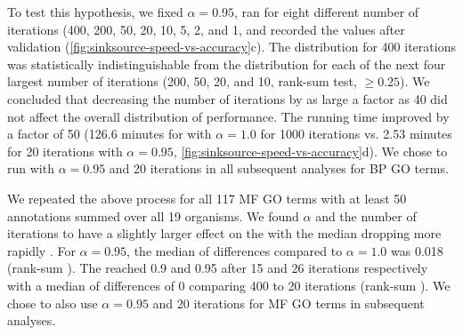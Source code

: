 To test this hypothesis, we fixed $\alpha = 0.95$, ran \sinksource for eight different number of iterations (400, 200, 50, 20, 10, 5, 2, and 1, and recorded the
\fmax values after \loso validation (\cref{fig:sinksource-speed-vs-accuracy}c). The \fmax distribution for 400 iterations was statistically indistinguishable from the distribution for each of the next four largest number of iterations (200, 50, 20, and 10, rank-sum test, \pval $\geq 0.25$).
We concluded that decreasing the number of iterations by as large a factor as 40 did not affect the overall distribution of \loso performance. 
The running time improved by a factor of 50 (126.6 minutes for \sinksource with $\alpha = 1.0$ for 1000 iterations vs. 2.53 minutes for 20 iterations with $\alpha = 0.95$, \cref{fig:sinksource-speed-vs-accuracy}d). 
We chose to run \sinksource with $\alpha = 0.95$ and 20 iterations in all subsequent analyses for BP GO terms. 

We repeated the above process for all 117 MF GO terms with at least 50 annotations summed over all 19 organisms. We found $\alpha$ and the number of iterations to have a slightly larger effect on the \fmax with the median dropping more rapidly . 
For $\alpha = 0.95$, the median of \fmax differences compared to $\alpha = 1.0$ was 0.018 (rank-sum ). 
The \ktau reached 0.9 and 0.95 after 15 and 26 iterations respectively with a median of \fmax differences of 0 comparing 400 to 20 iterations (rank-sum ).
We chose to also use $\alpha = 0.95$ and 20 iterations for MF GO terms in subsequent analyses.



